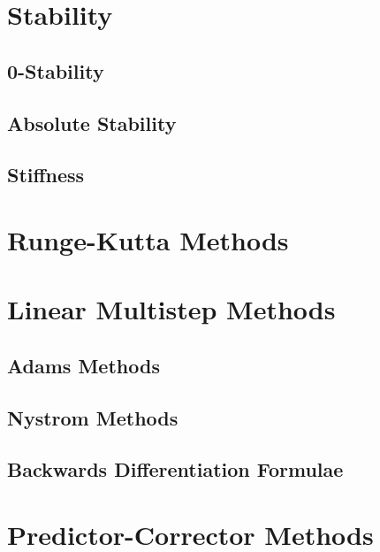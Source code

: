 \documentclass[12pt, twoside]{report}
\theoremstyle{plain}
\theoremstyle{definition}
\begin{document}
    \section{Stability}
    \label{2_stability}

        \subsection{0-Stability}
        \label{2_0-stability}

        \subsection{Absolute Stability}
        \label{2_absolute_stability}

        \subsection{Stiffness}
        \label{2_stiffness}


    \section{Runge-Kutta Methods}
    \label{2_runge_kutta}


    \section{Linear Multistep Methods}
    \label{2_lmms}

        \subsection{Adams Methods}
        \label{2_adams}

        \subsection{Nystrom Methods}
        \label{2_nystrom}

        \subsection{Backwards Differentiation Formulae}
        \label{2_bdf}


    \section{Predictor-Corrector Methods}
    \label{2_predictor_correctors}
\end{document}
